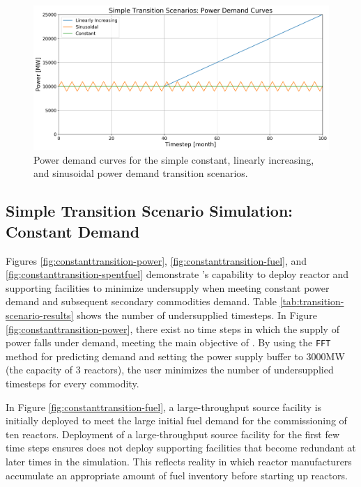     \begin{figure}[]
        \begin{center}
            \includegraphics[scale=0.45]{./figures/powerplots.png}
        \end{center}
            \caption{Power demand curves for the simple constant, 
            linearly increasing, and sinusoidal power demand 
            transition scenarios.}
        \label{fig:powerplots}
    \end{figure}

\subsection{Simple Transition Scenario Simulation: Constant Demand}
Figures \ref{fig:constanttransition-power}, \ref{fig:constanttransition-fuel},
and \ref{fig:constanttransition-spentfuel} demonstrate \deploy's capability 
to deploy reactor and supporting facilities to minimize undersupply 
when meeting constant power demand and subsequent secondary 
commodities demand.  
Table \ref{tab:transition-scenario-results} shows the number of 
undersupplied timesteps. 
In Figure \ref{fig:constanttransition-power}, there exist no time steps 
in which the supply of power falls under demand, meeting the main 
objective of \deploy. 
By using the \texttt{FFT} method for 
predicting demand and setting the power supply buffer to 3000MW 
(the capacity of 3 reactors), the user minimizes the number of 
undersupplied timesteps for every commodity.

In Figure \ref{fig:constanttransition-fuel},
a large-throughput source facility is initially
deployed to meet the large initial fuel demand for the commissioning 
of ten reactors. 
Deployment of a large-throughput source facility for the 
first few time steps ensures \deploy does not deploy supporting
facilities that become redundant at later times in  
the simulation.
This reflects reality in which reactor manufacturers accumulate
an appropriate amount of fuel inventory before starting 
up reactors. 

